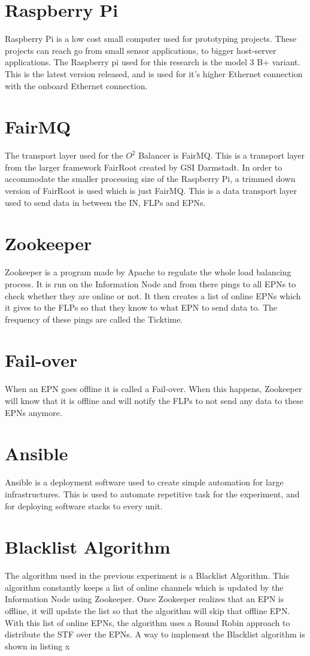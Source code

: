 \section{Raspberry Pi}
Raspberry Pi is a  low cost small computer used for prototyping projects. These projects can reach go from small sensor applications, to bigger host-server applications. The Raspberry pi used for this research is the model 3 B+ variant. This is the latest version released, and is used for it's higher Ethernet connection with the onboard Ethernet connection.

\section{FairMQ}
The transport layer used for the $O^2$ Balancer is FairMQ. This is a transport layer from the larger framework FairRoot created by GSI Darmstadt. In order to accommodate the smaller processing size of the Raspberry Pi, a trimmed down version of FairRoot is used which is just FairMQ. This is a data transport layer used to send data in between the IN, FLPs and EPNs.

\section{Zookeeper}
Zookeeper is a program made by Apache to regulate the whole load balancing process. It is run on the Information Node and from there pings to all EPNs to check whether they are online or not. It then creates a list of online EPNs which it gives to the FLPs so that they know to what EPN to send data to. The frequency of these pings are called the Ticktime.

\section{Fail-over}
When an EPN goes offline it is called a Fail-over. When this happens, Zookeeper will know that it is offline and will notify the FLPs to not send any data to these EPNs anymore.

\section{Ansible}
Ansible is a deployment software used to create simple automation for large infrastructures. This is used to automate repetitive task for the experiment, and for deploying software stacks to every unit. 

\section{Blacklist Algorithm}
The algorithm used in the previous experiment is a Blacklist Algorithm. This algorithm constantly keeps a list of online channels which is updated by the Information Node using Zookeeper. Once Zookeeper realizes that an EPN is offline, it will update the list so that the algorithm will skip that offline EPN. With this list of online EPNs, the algorithm uses a Round Robin approach to distribute the STF over the EPNs. A way to implement the Blacklist algorithm is shown in listing x